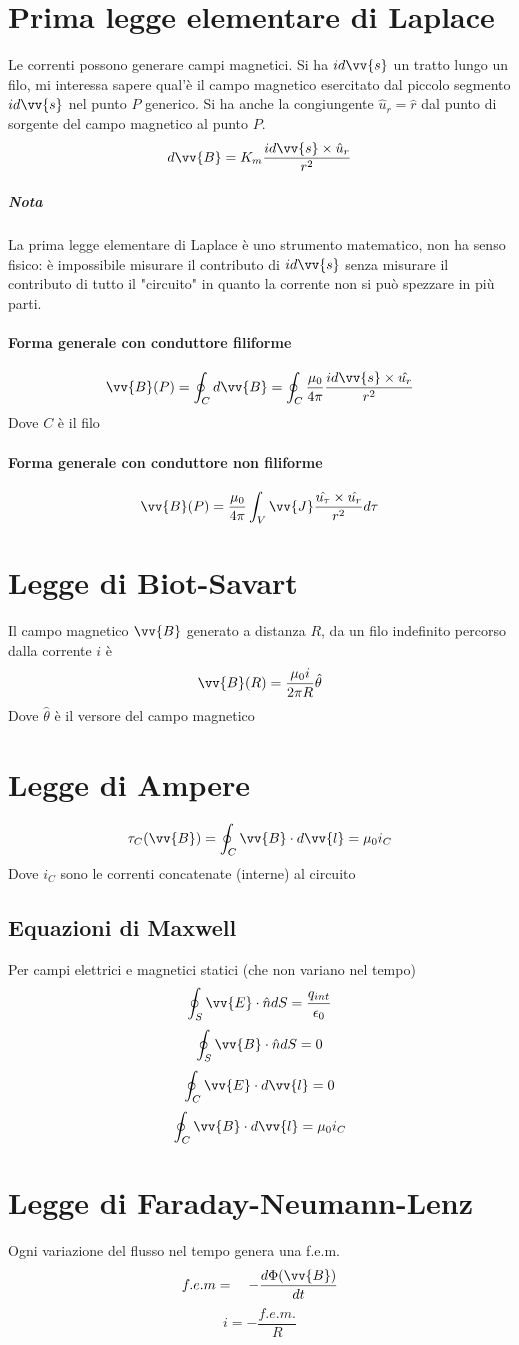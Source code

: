 \documentclass[a4paper]{report}
\begin{document}
  \section{Prima legge elementare di Laplace}
  Le correnti possono generare campi magnetici.
  Si ha $id\vv{s}$ un tratto lungo un filo, mi interessa sapere qual'è il campo magnetico esercitato dal piccolo segmento $id\vv{s}$ nel punto $P$ generico. Si ha anche la congiungente $\hat{u}_r=\hat{r}$ dal punto di sorgente del campo magnetico al punto $P$.
  $$ d\vv{B} = K_m \frac{id\vv{s} \times \hat{u}_r}{r^2} $$
  \subparagraph{Nota}
  La prima legge elementare di Laplace è uno strumento matematico, non ha senso fisico: è impossibile misurare il contributo di $id\vv{s}$ senza misurare il contributo di tutto il "circuito" in quanto la corrente non si può spezzare in più parti.
  \paragraph{Forma generale con conduttore filiforme}
  $$ \vv{B}(P) = \oint_C d\vv{B} = \oint_C \frac{\mu_0}{4\pi} \frac{id\vv{s} \times \hat{u_r}}{r^2}$$
  Dove $C$ è il filo
  \paragraph{Forma generale con conduttore non filiforme}
  $$ \vv{B}(P) = \frac{\mu_0}{4\pi} \int_V \vv{J}\frac{\hat{u_\tau} \times \hat{u_r}}{r^2} d\tau $$

  \section{Legge di Biot-Savart}
  Il campo magnetico $\vv{B}$ generato a distanza $R$, da un filo indefinito percorso dalla corrente $i$ è
  $$ \vv{B}(R) = \frac{\mu_0 i}{2 \pi R} \hat{\theta} $$
  Dove $\hat{\theta}$ è il versore del campo magnetico

  \section{Legge di Ampere}
  $$ \tau_C (\vv{B}) = \oint_C \vv{B} \cdot d\vv{l} = \mu_0 i_C $$
  Dove $i_C$ sono le correnti concatenate (interne) al circuito

  \subsection{Equazioni di Maxwell}
  Per campi elettrici e magnetici statici (che non variano nel tempo)
  $$ \oint_S \vv{E}\cdot \hat{n} dS = \frac{q_{int}}{\epsilon_0} $$
  $$ \oint_S \vv{B}\cdot \hat{n} dS = 0 $$
  $$ \oint_C \vv{E}\cdot d\vv{l} = 0 $$
  $$ \oint_C \vv{B} \cdot d\vv{l} = \mu_0 i_C $$

  \section{Legge di Faraday-Neumann-Lenz}
  Ogni variazione del flusso nel tempo genera una f.e.m.
  $$f.e.m = \quad -\frac{d\Phi(\vv{B})}{dt} $$
  $$ i = -\frac{f.e.m.}{R} $$
\end{document}
